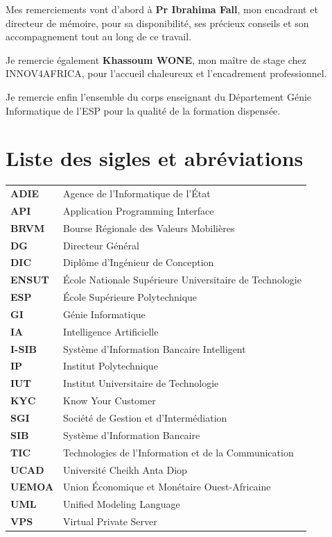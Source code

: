 \documentclass[a4paper,12pt]{report}
\begin{document}
Mes remerciements vont d'abord à \textbf{Pr Ibrahima Fall}, mon encadrant et
directeur de mémoire, pour sa disponibilité, ses précieux conseils et son
accompagnement tout au long de ce travail.

Je remercie également \textbf{Khassoum WONE}, mon maître de stage chez
INNOV4AFRICA, pour l'accueil chaleureux et l'encadrement professionnel.

Je remercie enfin l'ensemble du corps enseignant du Département Génie
Informatique de l'ESP pour la qualité de la formation dispensée.

\cleardoublepage

\chapter*{Liste des sigles et abréviations}
{}
\begin{tabular}{@{}p{2.5cm}p{10.5cm}}
\textbf{ADIE}    & Agence de l'Informatique de l'État \\[5pt]
\textbf{API}     & Application Programming Interface \\[5pt]
\textbf{BRVM}    & Bourse Régionale des Valeurs Mobilières \\[5pt]
\textbf{DG}      & Directeur Général \\[5pt]
\textbf{DIC}     & Diplôme d'Ingénieur de Conception \\[5pt]
\textbf{ENSUT}   & École Nationale Supérieure Universitaire de Technologie \\[5pt]
\textbf{ESP}     & École Supérieure Polytechnique \\[5pt]
\textbf{GI}      & Génie Informatique \\[5pt]
\textbf{IA}      & Intelligence Artificielle \\[5pt]
\textbf{I-SIB}   & Système d'Information Bancaire Intelligent \\[5pt]
\textbf{IP}      & Institut Polytechnique \\[5pt]
\textbf{IUT}     & Institut Universitaire de Technologie \\[5pt]
\textbf{KYC}     & Know Your Customer \\[5pt]
\textbf{SGI}     & Société de Gestion et d'Intermédiation \\[5pt]
\textbf{SIB}     & Système d'Information Bancaire \\[5pt]
\textbf{TIC}     & Technologies de l'Information et de la Communication \\[5pt]
\textbf{UCAD}    & Université Cheikh Anta Diop \\[5pt]
\textbf{UEMOA}   & Union Économique et Monétaire Ouest-Africaine \\[5pt]
\textbf{UML}     & Unified Modeling Language \\[5pt]
\textbf{VPS}     & Virtual Private Server \\[5pt]
\end{tabular}
\cleardoublepage
\end{document}
